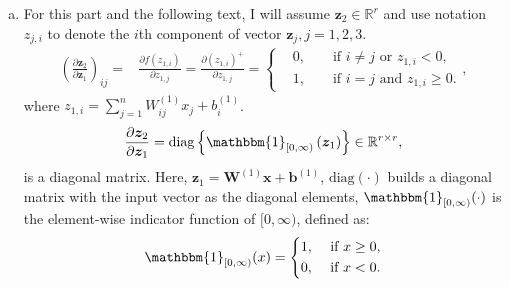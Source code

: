 \documentclass[10pt,a4paper]{article}
\theoremstyle{dotlessP}
\def\RR{\mathbb{R}}
\newcommand{\diag}{\text{diag}}
\newcommand{\dldy}{\frac{\partial l}{\partial \bm{\hat{y}}}}
\newcommand{\dydz}{\frac{\partial \bm{\hat{y}}}{\partial \bm z_3}}
\newcommand{\dzdz}{\frac{\partial \bm z_2}{\partial \bm z_1}}
\begin{document}
\begin{enumerate}[(a)]
\item For this part and the following text, I will assume $\bm z_2\in \RR^r$ and use notation $z_{j,i}$ to denote the $i$th component of vector $\bm z_j, j=1,2,3.$
\begin{equation}
\begin{aligned}
\left(\dzdz\right)_{ij} =&\frac{\partial f( z_{1,i})}{\partial z_{1,j}} = \frac{\partial ( z_{1,i})^+}{\partial z_{1,j}}
=\left\lbrace 
\begin{aligned}
&0, & &\text{ if } i\neq j \text{ or }   z_{1,i} <0,\\
& 1, &  &\text{ if } i= j \text{ and }   z_{1,i} \geq 0.
\end{aligned}
 \right.,
\end{aligned}
\end{equation}
where $z_{1,i}=\sum_{j=1}^{n} W^{(1)}_{ij} x_j +b^{(1)}_i$.
\begin{equation}
\dzdz =\diag\left\lbrace \mathbbm{1}_{[0,\infty)}\left(\bm z_1 \right)\right\rbrace
 \in \RR^{r\times r},
\end{equation}
is a diagonal matrix. Here, $\bm z_1=\bm W^{(1)} \bm x+\bm b^{(1)}$, $\diag(\cdot)$ builds a diagonal matrix with the input vector as the diagonal elements, $\mathbbm{1}_{[0,\infty)}(\cdot)$ is the element-wise indicator function of $[0,\infty)$, defined as:
\begin{equation}
\mathbbm{1}_{[0,\infty)}(x)=\left\lbrace 
\begin{aligned}
&1, & &\text{ if } x\geq 0,\\
& 0, &  &\text{ if } x< 0.
\end{aligned}
\right. 
\end{equation}


\end{enumerate}
\end{document}
